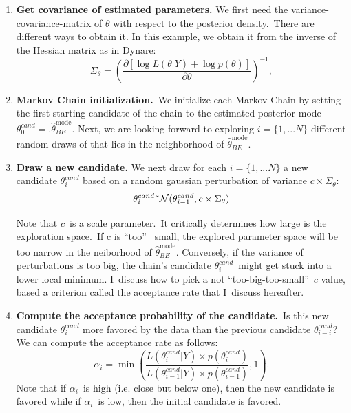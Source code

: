 \documentclass[a4paper,12pt]{article}%
\begin{document}
\begin{enumerate}
\item \textbf{Get covariance of estimated parameters.} We first need the
variance-covariance-matrix of $\theta$ with respect to the posterior
density.\ There are different ways to obtain it. In this example, we obtain it
from the inverse of the Hessian matrix as in Dynare:
\begin{equation}
\Sigma_{\theta}=\left(  \frac{\partial\left[  \log L(\theta|Y)+\log
p(\theta)\right]  }{\partial\theta}\right)  ^{-1},
\end{equation}


\item \textbf{Markov Chain initialization.}\ We initialize each Markov Chain
by setting the first starting candidate of the chain to the estimated
posterior mode $\theta_{0}^{cand}=$.$\hat{\theta}_{BE}^{\text{mode}}$. Next,
we are looking forward to exploring $i=\{1,...N\}$ different random draws of
that lies in the neighborhood of $\hat{\theta}_{BE}^{\text{mode}}$.

\item \textbf{Draw a new candidate.} We next draw for each $i=\{1,...N\}$ a
new candidate $\theta_{i}^{cand}$ based on a random gaussian perturbation of
variance $c\times\Sigma_{\theta}$:\
\begin{equation}
\theta_{i}^{cand}\symbol{126}\mathcal{N}(\theta_{i-1}^{cand},c\times
\Sigma_{\theta})
\end{equation}


Note that $c$\ is a scale parameter.\ It critically determines how large is
the exploration space.\ If c is \textquotedblleft too\textquotedblright%
\ small, the explored parameter space will be too narrow in the neiborhood of
$\hat{\theta}_{BE}^{\text{mode}}$. Conversely, if the variance of
perturbations is too big, the chain's candidate $\theta_{i}^{cand}$\ might get
stuck into a lower local minimum. I\ discuss how to pick a not
\textquotedblleft too-big-too-small\textquotedblright\ $c$ value, based a
criterion called the acceptance rate that I\ discuss hereafter.

\item \textbf{Compute the acceptance probability of the candidate.}\ Is this
new candidate $\theta_{i}^{cand}$ more favored by the data than the previous
candidate $\theta_{i-i}^{cand}$? We can compute the acceptance rate as
follows:
\begin{equation}
\alpha_{i}=\min\left(  \frac{L(\theta_{i}^{cand}|Y)\times p(\theta_{i}%
^{cand})}{L(\theta_{i-1}^{cand}|Y)\times p(\theta_{i-1}^{cand})},1\right)  .
\end{equation}
Note that if $\alpha_{i}$\ is high (i.e. close but below one), then the new
candidate is favored while if $\alpha_{i}$\ is low, then the initial candidate
is favored.


\end{enumerate}
\end{document}
